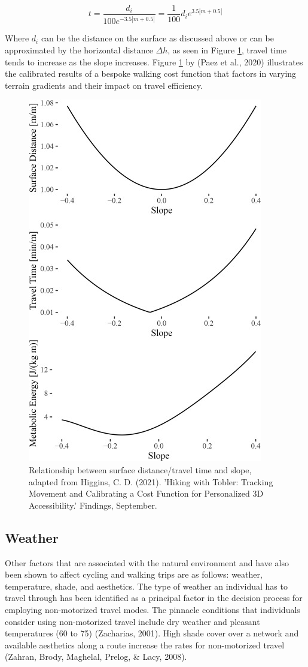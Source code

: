 \documentclass[
11pt, %
oneside, %
english, %
singlespacing, %
]{macthesis} %
\begin{document}
\begin{equation}
t = \frac{d_i}{100 e^{-3.5 |m + 0.5|}} = \frac{1}{100} d_i e^{3.5 |m + 0.5|}
\label{eq:amount-of-speed}
\end{equation}

Where \(d_i\) can be the distance on the surface as discussed above or can be approximated by the horizontal distance \(\Delta h\), as seen in Figure \ref{fig:ch02-plot-fig-03}, travel time tends to increase as the slope increases. Figure \ref{fig:ch02-plot-fig-03} by (Paez et al., 2020) illustrates the calibrated results of a bespoke walking cost function that factors in varying terrain gradients and their impact on travel efficiency.

\begin{figure}

{\centering \includegraphics[width=0.5\linewidth]{figure/ch02-Fig-03} 

}

\caption{Relationship between surface distance/travel time and slope, adapted from Higgins, C. D. (2021). 'Hiking with Tobler: Tracking Movement and Calibrating a Cost Function for Personalized 3D Accessibility.' Findings, September.}\label{fig:ch02-plot-fig-03}
\end{figure}

\newpage

\subsection{Weather}\label{weather}

Other factors that are associated with the natural environment and have also been shown to affect cycling and walking trips are as follows: weather, temperature, shade, and aesthetics. The type of weather an individual has to travel through has been identified as a principal factor in the decision process for employing non-motorized travel modes. The pinnacle conditions that individuals consider using non-motorized travel include dry weather and pleasant temperatures (60 to 75) (Zacharias, 2001). High shade cover over a network and available aesthetics along a route increase the rates for non-motorized travel (Zahran, Brody, Maghelal, Prelog, \& Lacy, 2008).
\end{document}
